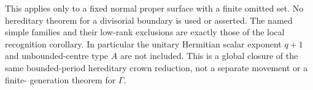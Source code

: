 \begin{remark}
This applies only to a fixed normal proper surface
with a finite omitted set. No hereditary theorem
for a divisorial boundary is used or asserted.
The named simple families and their low-rank
exclusions are exactly those of the local
recognition corollary. In particular the unitary
Hermitian scalar exponent $q+1$ and unbounded-centre
type $A$ are not included. This is a global closure
of the same bounded-period hereditary crown
reduction, not a separate movement or a finite-
generation theorem for $\Gamma$.
\end{remark}
